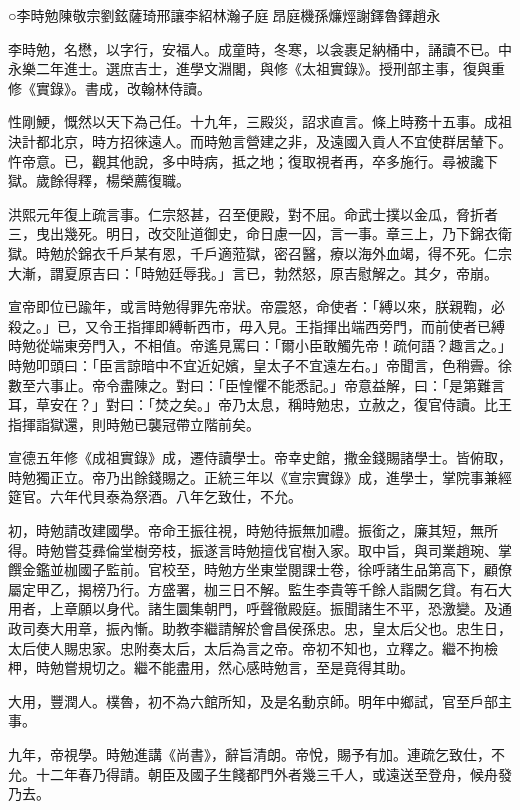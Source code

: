 
\begin{pinyinscope}
○李時勉陳敬宗劉鉉薩琦邢讓李紹林瀚子庭昂庭機孫燫烴謝鐸魯鐸趙永

李時勉，名懋，以字行，安福人。成童時，冬寒，以衾裹足納桶中，誦讀不已。中永樂二年進士。選庶吉士，進學文淵閣，與修《太祖實錄》。授刑部主事，復與重修《實錄》。書成，改翰林侍讀。

性剛鯁，慨然以天下為己任。十九年，三殿災，詔求直言。條上時務十五事。成祖決計都北京，時方招徠遠人。而時勉言營建之非，及遠國入貢人不宜使群居輦下。忤帝意。已，觀其他說，多中時病，抵之地；復取視者再，卒多施行。尋被讒下獄。歲餘得釋，楊榮薦復職。

洪熙元年復上疏言事。仁宗怒甚，召至便殿，對不屈。命武士撲以金瓜，脅折者三，曳出幾死。明日，改交阯道御史，命日慮一囚，言一事。章三上，乃下錦衣衛獄。時勉於錦衣千戶某有恩，千戶適蒞獄，密召醫，療以海外血竭，得不死。仁宗大漸，謂夏原吉曰：「時勉廷辱我。」言已，勃然怒，原吉慰解之。其夕，帝崩。

宣帝即位已踰年，或言時勉得罪先帝狀。帝震怒，命使者：「縛以來，朕親鞫，必殺之。」已，又令王指揮即縛斬西市，毋入見。王指揮出端西旁門，而前使者已縛時勉從端東旁門入，不相值。帝遙見罵曰：「爾小臣敢觸先帝！疏何語？趣言之。」時勉叩頭曰：「臣言諒暗中不宜近妃嬪，皇太子不宜遠左右。」帝聞言，色稍霽。徐數至六事止。帝令盡陳之。對曰：「臣惶懼不能悉記。」帝意益解，曰：「是第難言耳，草安在？」對曰：「焚之矣。」帝乃太息，稱時勉忠，立赦之，復官侍讀。比王指揮詣獄還，則時勉已襲冠帶立階前矣。

宣德五年修《成祖實錄》成，遷侍讀學士。帝幸史館，撒金錢賜諸學士。皆俯取，時勉獨正立。帝乃出餘錢賜之。正統三年以《宣宗實錄》成，進學士，掌院事兼經筵官。六年代貝泰為祭酒。八年乞致仕，不允。

初，時勉請改建國學。帝命王振往視，時勉待振無加禮。振銜之，廉其短，無所得。時勉嘗芟彞倫堂樹旁枝，振遂言時勉擅伐官樹入家。取中旨，與司業趙琬、掌饌金鑑並枷國子監前。官校至，時勉方坐東堂閱課士卷，徐呼諸生品第高下，顧僚屬定甲乙，揭榜乃行。方盛署，枷三日不解。監生李貴等千餘人詣闕乞貸。有石大用者，上章願以身代。諸生圜集朝門，呼聲徹殿庭。振聞諸生不平，恐激變。及通政司奏大用章，振內慚。助教李繼請解於會昌侯孫忠。忠，皇太后父也。忠生日，太后使人賜忠家。忠附奏太后，太后為言之帝。帝初不知也，立釋之。繼不拘檢柙，時勉嘗規切之。繼不能盡用，然心感時勉言，至是竟得其助。

大用，豐潤人。樸魯，初不為六館所知，及是名動京師。明年中鄉試，官至戶部主事。

九年，帝視學。時勉進講《尚書》，辭旨清朗。帝悅，賜予有加。連疏乞致仕，不允。十二年春乃得請。朝臣及國子生餞都門外者幾三千人，或遠送至登舟，候舟發乃去。


\end{pinyinscope}
